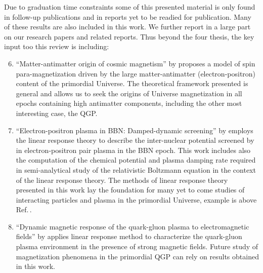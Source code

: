 Due to graduation time constraints some of this presented material is only found in follow-up publications and in reports yet to be readied for publication. Many of these results are also included in this work. We further report in a large part on our research papers and related reports. Thus beyond the four thesis, the key input too this review is including:
\begin{enumerate}
\setcounter{enumi}{5}
%
\item ``Matter-antimatter origin of cosmic magnetism'' by  proposes a model of spin para-magnetization driven by the large matter-antimatter (electron-positron) content of the primordial Universe. {\color{black} The theoretical framework presented is general and allows us to seek the origins of Universe magnetization in all epochs containing high antimatter components, including the other most interesting case, the QGP.}
%
\item ``Electron-positron plasma in BBN: Damped-dynamic screening'' by  employs the linear response theory to describe the inter-nuclear potential screened by in electron-positron pair plasma in the BBN epoch. This work includes also the computation of the chemical potential and plasma damping rate required in semi-analytical study of the relativistic Boltzmann equation in the context of the linear response theory. {\color{black} The methods of linear response theory presented in this work lay the foundation for many yet to come studies of interacting particles and plasma in the primordial Universe, example is above Ref.\,\cite{Grayson:2024uwg}.}
%
\item ``Dynamic magnetic response of the quark-gluon plasma to electromagnetic fields'' by  applies linear response method to characterize the quark-gluon plasma environment in the presence of strong magnetic fields. {\color{black} Future study of magnetization phenomena in the primordial QGP can rely on results obtained in this work.}

\end{enumerate}
